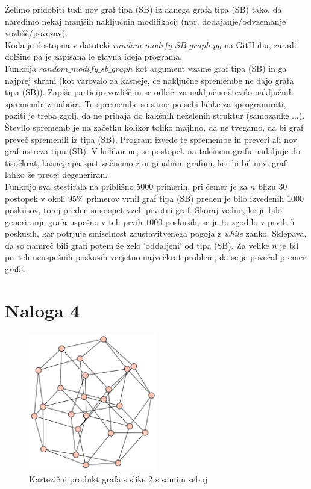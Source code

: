 \documentclass{article}
\begin{document}
Želimo pridobiti tudi nov graf tipa (SB) iz danega grafa tipa (SB) tako, 
da naredimo nekaj manjših naključnih modifikacij (npr. dodajanje/odvzemanje 
vozlišč/povezav). 
\\
Koda je dostopna v datoteki $random\_modify\_SB\_graph.py$ na GitHubu, zaradi 
dolžine pa je zapisana le glavna ideja programa. 
\\Funkcija $random\_modify\_sb\_graph$ kot argument vzame graf tipa (SB) in 
ga najprej shrani (kot varovalo za kasneje, če naključne spremembe ne dajo 
grafa tipa (SB)). Zapiše particijo vozlišč in se odloči za naključno število 
naključnih sprememb iz nabora. Te spremembe so same po sebi lahke za sprogramirati, paziti 
je treba zgolj, da ne prihaja do kakšnih neželenih struktur (samozanke ...). Število sprememb je na začetku kolikor toliko majhno, da ne tvegamo,
da bi graf preveč spremenili iz tipa (SB). Program izvede te spremembe in preveri ali nov graf ustreza tipu (SB).
V kolikor ne, se postopek na takšnem grafu nadaljuje do tisočkrat, kasneje pa 
spet začnemo z originalnim grafom, ker bi bil novi graf lahko že precej degeneriran.
\\
Funkcijo sva stestirala na približno 5000 primerih, pri čemer je za $n$ blizu $30$ postopek 
v okoli $95 \%$ primerov vrnil graf tipa (SB) preden je bilo izvedenih $1000$ poskusov, torej preden smo  
spet vzeli prvotni graf. Skoraj vedno, ko je bilo generiranje grafa uspešno v teh prvih $1000$ poskusih,
se je to zgodilo v prvih $5$ poskusih, kar potrjuje smiselnost zaustavitvenega pogoja z \emph{while} zanko.
Sklepava, da so namreč bili grafi potem že zelo 'oddaljeni' od tipa (SB). Za velike $n$ je bil pri teh neuspešnih 
poskusih verjetno največkrat problem, da se je povečal premer grafa.

\section{Naloga 4}


\begin{figure}[h!]
    \centering
    \includegraphics[width=0.5\textwidth]{sb_min_cartesian_example.png} %
    \caption{Kartezični produkt grafa s slike 2 s samim seboj}
    
\end{figure}
\end{document}
